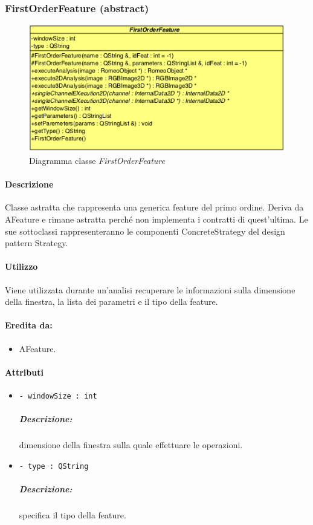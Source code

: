 \subsubsection{FirstOrderFeature (abstract)}
\label{FirstOrderFeature}
\begin{figure}[!h]
\centering
			\includegraphics[scale=1]{./Content/Immagini/modelCore/FirstOrderFeature.png}
			\caption{Diagramma classe \textsl{FirstOrderFeature}}
			\label{FirstOrderFeature_img}
\end{figure}

\paragraph{Descrizione \\} Classe astratta che rappresenta una generica feature\g{} del primo ordine. Deriva da AFeature e rimane astratta perché non implementa i contratti di quest'ultima. Le sue sottoclassi rappresenteranno le componenti ConcreteStrategy del design pattern\g{} Strategy.

\paragraph{Utilizzo\\} Viene utilizzata durante un'analisi recuperare le informazioni sulla dimensione della finestra, la lista dei parametri e il tipo della feature\g{}.

\paragraph{Eredita da:}
\begin{itemize}
	\item AFeature.
\end{itemize}

\paragraph{\textcolor{black}{Attributi\\}}
	\begin{itemize}
		\item \color{teal}\verb!- windowSize : int!
		\color{black}
		\subparagraph{Descrizione:} dimensione della finestra sulla quale effettuare le operazioni.
		\item \color{teal}\verb!- type : QString!
		\color{black}
		\subparagraph{Descrizione:} specifica il tipo della feature\g{}.
	\end{itemize}

